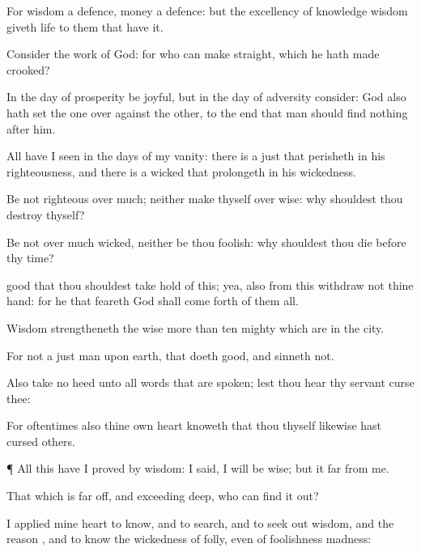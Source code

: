 {For
wisdom
{} a
defence,
{}
money
{} a
defence: but the
excellency of
knowledge
{}
wisdom giveth
life to them that
have it.

Consider the
work of
God: for who
can make
{}
straight, which he hath made
crooked?

In the
day of
prosperity be
joyful, but in the
day of
adversity
consider:
God also hath
set the one over
against the other, to the
end that
man should
find
nothing
after him.

All
{} have I
seen in the
days of my
vanity: there
is a
just
{} that
perisheth in his
righteousness, and there is a
wicked
{} that
prolongeth
{} in his
wickedness.

Be not
righteous over
much; neither make thyself
over
wise: why shouldest thou
destroy thyself?

Be not over
much
wicked, neither be thou
foolish: why shouldest thou
die before thy
time?

good that thou shouldest take
hold of this; yea, also from
this
withdraw not thine
hand: for he that
feareth
God shall come
forth of them all.

Wisdom
strengtheneth the
wise more than
ten
mighty
{} which are in the
city.

For
{} not a
just
man upon
earth, that
doeth
good, and
sinneth not.

Also
take no
heed unto all
words that are
spoken; lest thou
hear thy
servant
curse thee:

For
oftentimes also thine own
heart
knoweth that thou thyself likewise hast
cursed
others.


\par }{\PP {}¶ All
this have I
proved by
wisdom: I
said, I will be
wise; but it
{}
far from me.

That which is far
off, and exceeding
deep, who can find it
out?

I
applied mine
heart to
know, and to
search, and to seek
out
wisdom, and the
reason
{}, and to
know the
wickedness of
folly, even of
foolishness
{}
madness:

}
